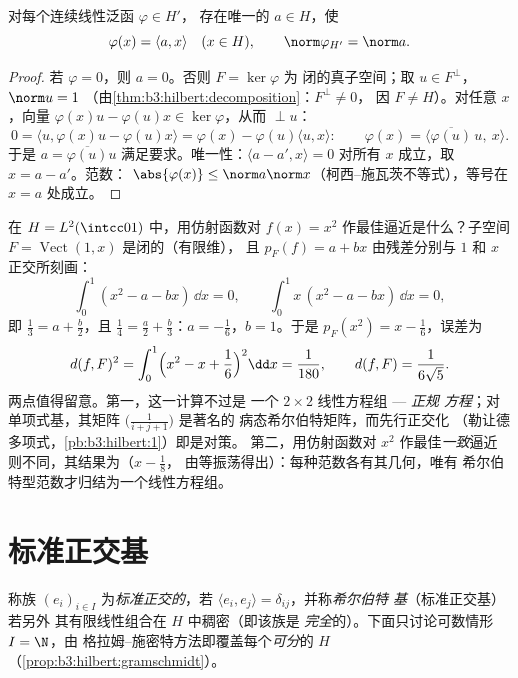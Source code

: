 \begin{theorem}[里斯表示定理]\label{thm:b3:hilbert:riesz}
对每个连续线性泛函 $\varphi \in H'$，
存在唯一的 $a \in H$，使
\[
\varphi(x) = \langle a, x\rangle \quad (x \in H),
\qquad \norm\varphi_{H'} = \norm a .
\]
\end{theorem}

\begin{proof}
若 $\varphi = 0$，则 $a = 0$。否则 $F = \ker\varphi$ 为
闭的真子空间；取 $u \in F^\perp$，$\norm u = 1$
（由\cref{thm:b3:hilbert:decomposition}：$F^\perp \neq 0$，
因 $F \neq H$）。对任意 $x$，向量 $\varphi(x)u -
\varphi(u)x \in \ker\varphi$，从而 $\perp u$：
\[
0 = \langle u, \varphi(x)u - \varphi(u)x\rangle
= \varphi(x) - \varphi(u)\langle u, x\rangle :
\qquad \varphi(x) = \langle
\overline{\varphi(u)}\,u,\ x\rangle .
\]
于是 $a = \overline{\varphi(u)}u$ 满足要求。唯一性：$\langle a
- a', x\rangle = 0$ 对所有 $x$ 成立，取 $x = a - a'$。范数：
$\abs{\varphi(x)} \leq \norm a\norm x$（柯西–施瓦茨不等式），等号在
$x = a$ 处成立。
\end{proof}

\begin{example}[一个投影的完整计算]
\label{ex:b3:hilbert:projectionexample}
在 $H = L^2(\intcc01)$ 中，用仿射函数对
$f(x) = x^2$ 作最佳逼近是什么？子空间 $F =
\operatorname{Vect}(1, x)$ 是闭的（有限维），
且 $p_F(f) = a + bx$ 由残差分别与
$1$ 和 $x$ 正交所刻画：
\[
\int_0^1(x^2 - a - bx)\,\dd x = 0,
\qquad
\int_0^1x\,(x^2 - a - bx)\,\dd x = 0,
\]
即 $\frac13 = a + \frac b2$，且 $\frac14 = \frac a2 +
\frac b3$：$a = -\frac16$，$b = 1$。于是 $p_F(x^2) = x -
\frac16$，误差为
\[
d(f, F)^2 = \int_0^1\Bigl(x^2 - x + \frac16\Bigr)^2\dd x =
\frac1{180},
\qquad d(f, F) = \frac1{6\sqrt5} .
\]
两点值得留意。第一，这一计算不过是
一个 $2\times2$ 线性方程组 --- \emph{正规
方程}；对单项式基，其矩阵
$\bigl(\frac1{i+j+1}\bigr)$ 是著名的
病态希尔伯特矩阵，而先行正交化
（勒让德多项式，\cref{pb:b3:hilbert:1}）即是对策。
第二，用仿射函数对 $x^2$ 作最佳\emph{一致}逼近
则不同，其结果为（$x - \frac18$，
由等振荡得出）：每种范数各有其几何，唯有
希尔伯特型范数才归结为一个线性方程组。
\end{example}

\section{标准正交基}

\begin{definition}\label{def:b3:hilbert:onb}
称族 $(e_i)_{i\in I}$ 为\emph{标准正交的}，若 $\langle
e_i, e_j\rangle = \delta_{ij}$，并称\emph{希尔伯特
基}（标准正交基）若另外
其有限线性组合在 $H$ 中稠密（即该族是
\emph{完全}的）。下面只讨论可数情形 $I = \N$，由
格拉姆–施密特方法即覆盖每个\emph{可分}的 $H$
（\cref{prop:b3:hilbert:gramschmidt}）。
\end{definition}

